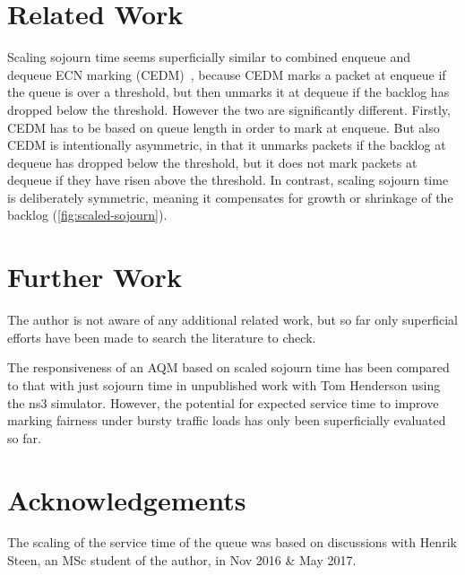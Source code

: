 \section{Related Work}\label{sec:related}

Scaling sojourn time seems superficially similar to combined enqueue and dequeue ECN marking (CEDM)~\cite{Shan17:CEDM}, because CEDM marks a packet at enqueue if the queue is over a threshold, but then unmarks it at dequeue if the backlog has dropped below the threshold. However the two are significantly different. Firstly, CEDM has to be based on queue length in order to mark at enqueue. But also CEDM is intentionally asymmetric, in that it unmarks packets if the backlog at dequeue has dropped below the threshold, but it does not mark packets at dequeue if they have risen above the threshold. In contrast, scaling sojourn time is deliberately symmetric, meaning it compensates for growth or shrinkage of the backlog (\autoref{fig:scaled-sojourn}).

\section{Further Work}

The author is not aware of any additional related work, but so far only superficial efforts have been made to search the literature to check.

The responsiveness of an AQM based on scaled sojourn time has been compared to that with just sojourn time in unpublished work with Tom Henderson using the ns3 simulator. However, the potential for expected service time to improve marking fairness under bursty traffic loads has only been superficially evaluated so far.

\section{Acknowledgements}\label{sigqdyntr_acks}

The scaling of the service time of the queue was based on discussions with Henrik Steen, an MSc student of the author, in Nov 2016 \& May 2017.